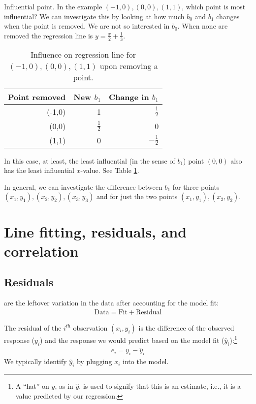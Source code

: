 	\begin{example}{Influential point.}
		In the example $(-1,0), (0,0), (1,1)$, which point is most influential?
		We can investigate this by looking at how much $b_0$ and $b_1$ changes when the point is removed.
		We are not so interested in $b_0$.
		When none are removed the regression line is $y=\frac{x}2+\frac13$.

		\begin{table}
		\centering
		\begin{tabular}{r | r | r}
		Point removed	& New $b_1$ 	& Change in $b_1$\\
		\hline
		(-1,0)		& 1			&  $\frac12$\\
		(0,0)			& $\frac12$	& 0\\
		(1,1)			& 0			& $-\frac12$\\
		\hline
		\end{tabular}
		\caption{Influence on regression line for $(-1,0), (0,0), (1,1)$ upon removing a point.}\label{influential}
		\end{table}
		In this case, at least, the least influential (in the sense of $b_1$) point $(0,0)$ also has the least influential $x$-value.
		See Table \ref{influential}.
	\end{example}

	In general, we can investigate the difference between $b_1$ for three points $(x_1,y_1),(x_2,y_2),(x_3,y_3)$ and for just the two points $(x_1,y_1),(x_2,y_2)$.


\section{Line fitting, residuals, and correlation}
\label{lineFittingResidualsCorrelation}

\subsection{Residuals}

	 are the leftover variation in the data after accounting for the model fit:
	\begin{align*}
	\text{Data} = \text{Fit} + \text{Residual}
	\end{align*}

	\begin{termBox}{
	The residual of the $i^{th}$ observation $(x_i, y_i)$ is the difference of
	the observed response ($y_i$) and
	the response we would predict based on the model fit ($\hat{y}_i$):\footnote{
		A ``hat'' on $y$, as in $\hat y$, is used to signify that this is an estimate, i.e., it is a value predicted by our regression.
	}
	\begin{eqnarray*}
		e_i = y_i - \hat{y}_i
	\end{eqnarray*}
	We typically identify $\hat{y}_i$ by plugging $x_i$ into the model.}
	\end{termBox}


